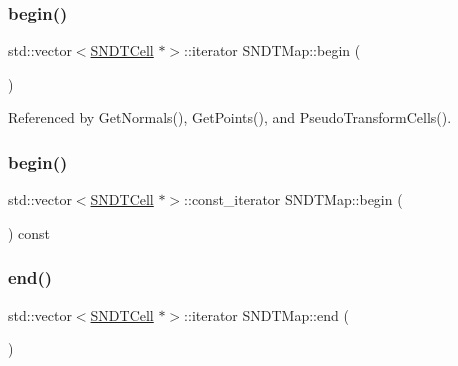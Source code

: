 \subsubsection{\texorpdfstring{begin()}{begin()}\hspace{0.1cm}{\footnotesize\ttfamily [1/2]}}
{\footnotesize\ttfamily std\+::vector$<$\hyperlink{classSNDTCell}{S\+N\+D\+T\+Cell} $\ast$$>$\+::iterator S\+N\+D\+T\+Map\+::begin (\begin{DoxyParamCaption}{ }\end{DoxyParamCaption})\hspace{0.3cm}{\ttfamily [inline]}}



Referenced by Get\+Normals(), Get\+Points(), and Pseudo\+Transform\+Cells().

\mbox{\label{classSNDTMap_a18c7df6c92de6cb0d27399153ed3feab}} 
\subsubsection{\texorpdfstring{begin()}{begin()}\hspace{0.1cm}{\footnotesize\ttfamily [2/2]}}
{\footnotesize\ttfamily std\+::vector$<$\hyperlink{classSNDTCell}{S\+N\+D\+T\+Cell} $\ast$$>$\+::const\+\_\+iterator S\+N\+D\+T\+Map\+::begin (\begin{DoxyParamCaption}{ }\end{DoxyParamCaption}) const\hspace{0.3cm}{\ttfamily [inline]}}

\mbox{\label{classSNDTMap_a0df8cc3fc6db19aa009f9229590445bb}} 
\subsubsection{\texorpdfstring{end()}{end()}\hspace{0.1cm}{\footnotesize\ttfamily [1/2]}}
{\footnotesize\ttfamily std\+::vector$<$\hyperlink{classSNDTCell}{S\+N\+D\+T\+Cell} $\ast$$>$\+::iterator S\+N\+D\+T\+Map\+::end (\begin{DoxyParamCaption}{ }\end{DoxyParamCaption})\hspace{0.3cm}{\ttfamily [inline]}}



